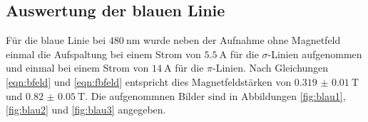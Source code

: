 \subsection{Auswertung der blauen Linie}
Für die blaue Linie bei $\SI{480}{\nano\meter}$  wurde neben der Aufnahme ohne Magnetfeld einmal
die Aufspaltung bei einem Strom von $\SI{5.5}{\ampere}$ für die $\sigma$-Linien aufgenommen
und einmal bei einem Strom von $\SI{14}{\ampere}$ für die $\pi$-Linien. Nach Gleichungen
\ref{eqn:bfeld} und \ref{eqn:fbfeld} entspricht dies Magnetfeldstärken von $\SI{0.319(10)}{\tesla}$
und $\SI{0.82(5)}{\tesla}$.
Die aufgenommnen Bilder sind in Abbildungen \ref{fig:blau1}, \ref{fig:blau2} und \ref{fig:blau3} angegeben.
\begin{figure}
\begin{subfigure}[c]{0.5\textwidth}


\end{subfigure}
\end{figure}
